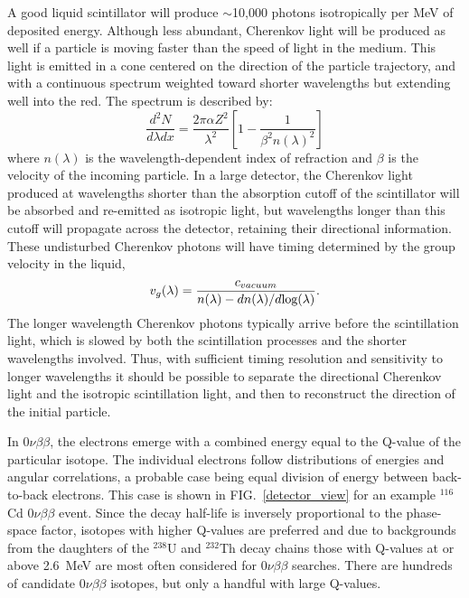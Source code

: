 \documentclass[aps,prc,twocolumn,groupedaddress,showpacs,amsmath,amssymb,floatfix,superscriptaddress]{revtex4}
\begin{document}
A good liquid scintillator will produce $\sim$10,000 photons
isotropically per MeV of deposited energy. Although less abundant,
Cherenkov light will be produced as well if a particle is moving
faster than the speed of light in the medium.  This light is emitted
in a cone centered on the direction of the particle trajectory, and
with a continuous spectrum weighted toward shorter wavelengths but
extending well into the red. The spectrum is described
by\cite{Cherenkov34}:
\begin{equation}
\label{eqCherenkov}
\frac{d^2N}{d\lambda dx} = \frac{2 \pi \alpha Z^2}{\lambda^2} \left [ 1 - \frac{1}{\beta^2 n(\lambda)^2} \right ]
\end{equation}
where $n(\lambda)$ is the wavelength-dependent index of refraction and
$\beta$ is the velocity of the incoming particle. In a large detector,
the Cherenkov light produced at wavelengths shorter than the
absorption cutoff of the scintillator will be absorbed and re-emitted
as isotropic light, but wavelengths longer than this cutoff will
propagate across the detector, retaining their directional
information. These undisturbed Cherenkov
photons will have timing determined by the group 
velocity\cite{group_velocity_article,pdg_review_2012,tamm1939} in the liquid,
\begin{equation}
\label{eqGroup}
v_{g}(\lambda) = \frac{c_{vacuum}}{n(\lambda) - dn(\lambda)/d\textnormal{log}(\lambda)}.
\end{equation}
The longer wavelength Cherenkov photons typically arrive before the
scintillation light, which is slowed by both the scintillation
processes and the shorter wavelengths involved. Thus, with sufficient
timing resolution and sensitivity to longer wavelengths it should be
possible to separate the directional Cherenkov light and the isotropic
scintillation light, and then to reconstruct the direction of the
initial particle.

In $0\nu\beta\beta$, the electrons emerge with a combined energy equal
to the Q-value of the particular isotope. The individual
electrons follow distributions of energies and angular correlations, 
a probable case being equal division of energy between back-to-back
electrons\cite{phasespace}. This case is shown in FIG.~\ref{detector_view}
for an example $^{116}$Cd $0\nu\beta\beta$ event. Since the decay
half-life is inversely proportional to the phase-space factor, isotopes with
higher Q-values are preferred and due to backgrounds from the daughters
of the $^{238}$U and $^{232}$Th decay chains those with Q-values at or
above 2.6~MeV are most often considered for $0\nu\beta\beta$ searches.
There are hundreds of candidate $0\nu\beta\beta$ isotopes\cite{tabledbb},
but only a handful with large Q-values. 
\end{document}

